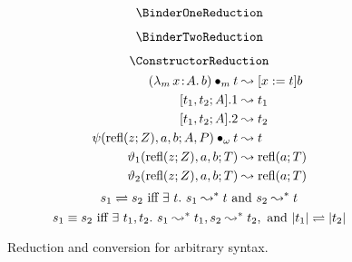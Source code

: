 
\begin{figure}
    \centering
    \begin{minipage}{0.5\textwidth}
        $$\BinderOneReduction$$
    \end{minipage}%
    \begin{minipage}{0.5\textwidth}
        $$\BinderTwoReduction$$
    \end{minipage}
    $$\ConstructorReduction$$
    \begin{align*}
        ({\lambda_m}\, x\! : \! A.\, b) \bullet_{m} t &\leadsto [x := t]b \\
        [t_1, t_2; A].1 &\leadsto t_1 \\
        [t_1, t_2; A].2 &\leadsto t_2 \\
        \psi(\text{refl}(z; Z), a, b; A, P) \bullet_{\omega} t &\leadsto t \\
        \vartheta_1(\text{refl}(z; Z), a, b; T) &\leadsto \text{refl}(a; T) \\
        \vartheta_2(\text{refl}(z; Z), a, b; T) &\leadsto \text{refl}(a; T) \\
    \end{align*}
    \vspace{-.4in}
    $$s_1 \rightleftharpoons s_2 \text{ iff } \exists\ t.\ s_1 \leadsto^* t \text{ and } s_2 \leadsto^* t$$
    $$s_1 \equiv s_2 \text{ iff } \exists\ t_1, t_2.\ s_1 \leadsto^* t_1, s_2 \leadsto^* t_2, \text{ and } |t_1| \rightleftharpoons |t_2|$$
    \caption{Reduction and conversion for arbitrary syntax.}
    \label{fig:reduction}
\end{figure}


